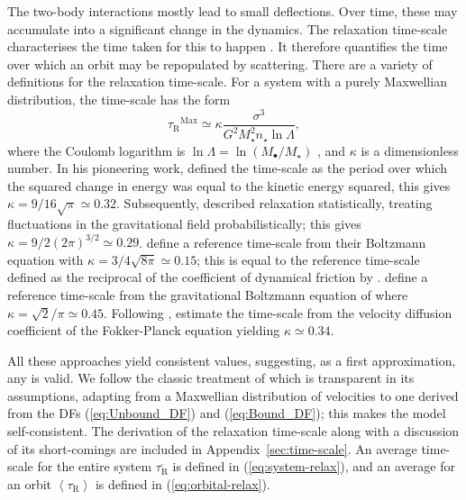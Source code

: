 \documentclass[useAMS,usedcolumn,usegraphicx,usenatbib]{mn2e}
\newcommand{\eqnref}[1]{(\ref{eq:#1})}
\newcommand{\apref}[1]{Appendix~\ref{sec:#1}}
\newcommand{\sub}[1]{\ensuremath{_\mathrm{#1}}}
\newcommand{\super}[1]{\ensuremath{^\mathrm{#1}}}
\begin{document}
The two-body interactions mostly lead to small deflections. Over time, these may accumulate into a significant change in the dynamics. The relaxation time-scale characterises the time taken for this to happen \citep[section 1.2.1]{Binney2008}. It therefore quantifies the time over which an orbit may be repopulated by scattering. There are a variety of definitions for the relaxation time-scale. For a system with a purely Maxwellian distribution, the time-scale has the form
\begin{equation}
\tau\sub{R}\super{Max} \simeq \kappa\frac{\sigma^3}{G^2M_\star^2 n_\star\ln\Lambda},
\label{eq:tauMaxwell}
\end{equation}
where the Coulomb logarithm is $\ln\Lambda = \ln(M_\bullet/M_\star)$ \citep{Bahcall1976}, and $\kappa$ is a dimensionless number. In his pioneering work, \citet{Chandrasekhar1941, Chandrasekhar1960} defined the time-scale as the period over which the squared change in energy was equal to the kinetic energy squared, this gives $\kappa = 9/16\sqrt{\pi} \simeq 0.32$. Subsequently, \citet{Chandrasekhar1941a} described relaxation statistically, treating fluctuations in the gravitational field probabilistically; this gives $\kappa = 9/2(2\pi)^{3/2} \simeq 0.29$. \citet{Bahcall1977} define a reference time-scale from their Boltzmann equation with $\kappa = 3/4\sqrt{8\pi} \simeq 0.15$; this is equal to the reference time-scale defined as the reciprocal of the coefficient of dynamical friction by \citet{Chandrasekhar1943a, Chandrasekhar1943}. \citet{Spitzer1958} define a reference time-scale from the gravitational Boltzmann equation of \citet{Spitzer1951} where $\kappa = \sqrt{2}/\pi \simeq 0.45$. Following \citet{Spitzer1971}, \citet[section 7.4.5]{Binney2008} estimate the time-scale from the velocity diffusion coefficient of the Fokker-Planck equation yielding $\kappa \simeq 0.34$.

All these approaches yield consistent values, suggesting, as a first approximation, any is valid. We follow the classic treatment of \citet[chapter 2]{Chandrasekhar1960} which is transparent in its assumptions, adapting from a Maxwellian distribution of velocities to one derived from the DFs \eqnref{Unbound_DF} and \eqnref{Bound_DF}; this makes the model self-consistent. The derivation of the relaxation time-scale along with a discussion of its short-comings are included in \apref{time-scale}. An average time-scale for the entire system $\overline{\tau\sub{R}}$ is defined in \eqnref{system-relax}, and an average for an orbit $\left\langle\tau\sub{R}\right\rangle$ is defined in \eqnref{orbital-relax}. 
\end{document}
